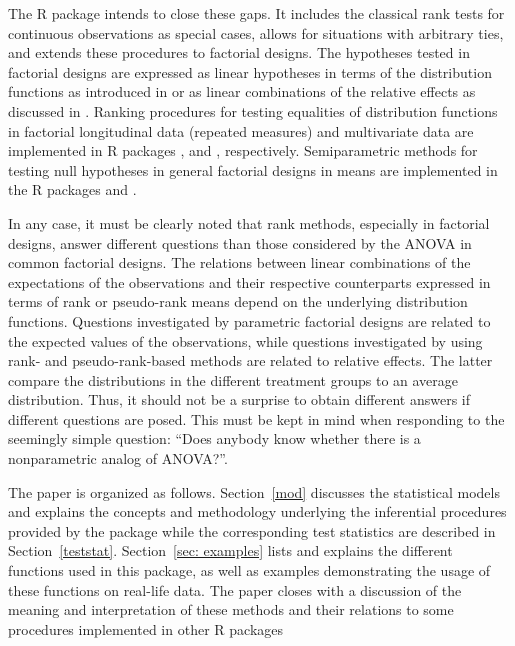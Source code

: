 The R package  intends to close these gaps. It includes 
the classical rank tests for continuous observations as special cases, 
allows for situations with arbitrary ties, and extends these procedures to 
factorial designs. The hypotheses tested in factorial designs are expressed as 
linear hypotheses in terms of the distribution functions as introduced in 
\cite{akritas1997nonparametric} or as linear combinations of the relative 
effects as discussed in \cite{brunner2017rank}. Ranking procedures 
for testing equalities of distribution functions in factorial longitudinal data (repeated measures) and multivariate data are implemented in R packages
 \citep{noguchi2012nparld},  and  \citep{burchett2017nonparametric,kiefel2022package}, respectively. Semiparametric methods for testing null hypotheses in general factorial designs in means are implemented in the R packages  \citep{friedrich2017gfd} and  \citep{friedrich2019resampling}.


In any case, it must be clearly noted that rank methods, especially in 
factorial designs, answer different questions than those considered by the 
ANOVA in common factorial designs. The relations between linear combinations of 
the expectations of the observations and their respective counterparts 
expressed in terms of rank or pseudo-rank means depend on the underlying 
distribution functions. Questions investigated by parametric factorial designs 
are related to the expected values of the observations, while questions 
investigated by using rank- and pseudo-rank-based methods are related to 
relative effects. The latter compare the distributions in the different 
treatment groups to an average distribution. Thus, it should not be a surprise 
to obtain different answers if different questions are posed. This must be kept 
in mind when responding to the seemingly simple question: ``Does anybody know 
whether there is a nonparametric analog of ANOVA?''. 

The paper is organized as follows. Section~\ref{mod} discusses the statistical 
models and explains the concepts and methodology underlying the inferential procedures 
provided by the package  while the corresponding test statistics
are described in Section~\ref{teststat}. Section~\ref{sec: examples} lists and 
explains the different functions used in this package, as well as examples 
demonstrating the usage of these functions on real-life data. The paper closes with a  discussion of the meaning and interpretation of these methods and their relations to some procedures implemented in other R packages



